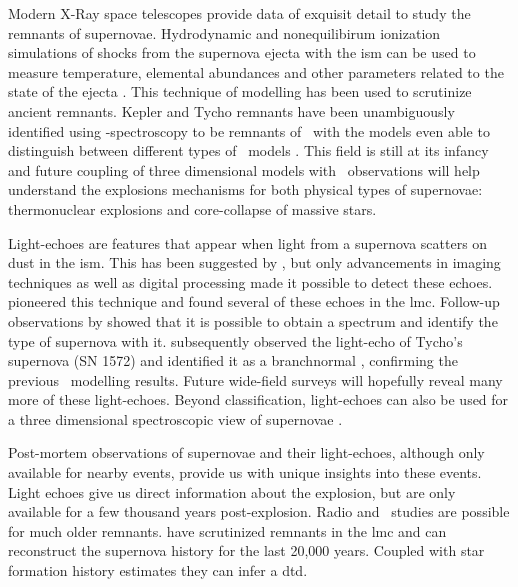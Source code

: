 Modern X-Ray space telescopes provide data of exquisit detail to study the remnants of supernovae. Hydrodynamic and nonequilibirum ionization simulations of shocks from the supernova ejecta with the \gls{ism} can be used to measure temperature, elemental abundances and other parameters related to the state of the ejecta \citep{2003ApJ...593..358B, 2004AstL...30..737S, 2005ApJ...624..198B}. This technique of modelling has been used to scrutinize ancient remnants. Kepler and Tycho remnants have been unambiguously identified using \xray-spectroscopy to be remnants of \sneia\  with the models even able to distinguish between different types of \snia\ models \citep{2006ApJ...645.1373B, 2007ApJ...668L.135R}. This field is still at its infancy and future coupling of three dimensional models with \xray\ observations will help understand the explosions mechanisms for both physical types of supernovae: thermonuclear explosions and core-collapse of massive stars. 

Light-echoes are features that appear when light from a supernova scatters on dust in the \gls{ism}. This has been suggested by \citet{1940RvMP...12...66Z}, but only advancements in imaging techniques as well as digital processing made it possible to detect these echoes. \cite{2005Natur.438.1132R} pioneered this technique and found several of these echoes in the \gls{lmc}. Follow-up observations by \cite{2008ApJ...680.1137R} showed that it is possible to obtain a spectrum and identify the type of supernova with it. 
\cite{2008Natur.456..617K} subsequently observed the light-echo of Tycho's supernova (SN 1572) and identified it as a \gls{branchnormal} \snia, confirming the previous \xray\ modelling results. Future wide-field surveys will hopefully reveal many more of these light-echoes. Beyond classification, light-echoes can also be used for a three dimensional spectroscopic view of supernovae \citep[demonstrated on the example of  remnant. see][]{2011ApJ...732....3R}.

Post-mortem observations of supernovae and their light-echoes, although only available for nearby events, provide us with unique insights into these events.  Light echoes give us direct information about the explosion, but are only available for a few thousand years post-explosion. Radio and \xray\ studies are possible for much older remnants.  \citet{2010MNRAS.407.1314M} have scrutinized remnants in the \gls{lmc} and can reconstruct the supernova history for the last 20,000 years. Coupled with star formation history estimates they can infer a \gls{dtd}.

